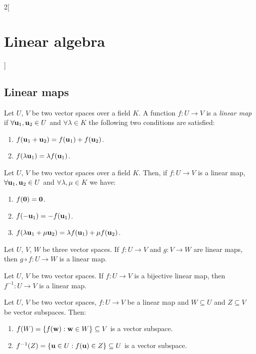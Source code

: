 \documentclass[../../../main.tex]{subfiles}
\begin{document}
\begin{multicols}{2}[\section{Linear algebra}]
  \subsection{Linear maps}
  \begin{definition}
    Let $U$, $V$ be two vector spaces over a field $K$. A function $f:U\rightarrow V$ is a \emph{linear map} if $\forall\boldsymbol{\mathrm{u}}_1,\boldsymbol{\mathrm{u}}_2\in U$ and $\forall\lambda\in K$ the following two conditions are satisfied:
    \begin{enumerate}
      \item $f(\boldsymbol{\mathrm{u}}_1+\boldsymbol{\mathrm{u}}_2)=f(\boldsymbol{\mathrm{u}}_1)+f(\boldsymbol{\mathrm{u}}_2)$.
      \item $f(\lambda \boldsymbol{\mathrm{u}}_1)=\lambda f(\boldsymbol{\mathrm{u}}_1)$.
    \end{enumerate}
  \end{definition}
  \begin{proposition}
    Let $U$, $V$ be two vector spaces over a field $K$. Then, if $f:U\rightarrow V$ is a linear map, $\forall\boldsymbol{\mathrm{u}}_1,\boldsymbol{\mathrm{u}}_2\in U$ and $\forall\lambda,\mu\in K$ we have:
    \begin{enumerate}
      \item $f(\boldsymbol{\mathrm{0}})=\boldsymbol{\mathrm{0}}$.
      \item $f(-\boldsymbol{\mathrm{u}}_1)=-f(\boldsymbol{\mathrm{u}}_1)$.
      \item $f(\lambda\boldsymbol{\mathrm{u}}_1+\mu\boldsymbol{\mathrm{u}}_2)=\lambda f(\boldsymbol{\mathrm{u}}_1)+\mu f(\boldsymbol{\mathrm{u}}_2)$.
    \end{enumerate}
  \end{proposition}
  \begin{proposition}
    Let $U$, $V$, $W$ be three vector spaces. If $f:U\rightarrow V$ and $g:V\rightarrow W$ are linear maps, then $g\circ f:U\rightarrow W$ is a linear map.
  \end{proposition}
  \begin{proposition}
    Let $U$, $V$ be two vector spaces. If $f:U\rightarrow V$ is a bijective linear map, then $f^{-1}:U\rightarrow V$ is a linear map.
  \end{proposition}
  \begin{proposition}
    Let $U$, $V$ be two vector spaces, $f:U\rightarrow V$ be a linear map and $W\subseteq U$ and $Z\subseteq V$ be vector subspaces. Then:
    \begin{enumerate}
      \item $f(W)=\{f(\boldsymbol{\mathrm{w}}): \boldsymbol{\mathrm{w}}\in W\}\subseteq V$ is a vector subspace.
      \item $f^{-1}(Z)=\{\boldsymbol{\mathrm{u}}\in U: f(\boldsymbol{\mathrm{u}})\in Z\}\subseteq U$ is a vector subspace.
    \end{enumerate}

\end{proposition}
\end{multicols}
\end{document}
